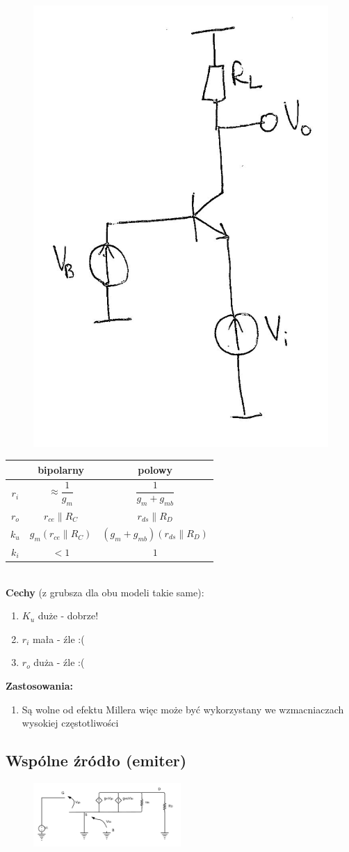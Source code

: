 \documentclass[10pt,a4paper]{article}
\begin{document}
\begin{figure}[H]
\centering
\includegraphics[height=0.5\textwidth]{WB}
\end{figure}
\begin{tabular}{c|c|c}
& bipolarny & polowy \\
\hline
$r_i$ & $\approx \dfrac{1}{g_m}$ & $ \dfrac{1}{g_m + g_{mb}}$ \\ 

$r_o$ & $r_{ce}\parallel R_C$ & $r_{ds} \parallel R_D $\\ 

$k_u$ & $g_m (r_{ce}\parallel R_C)$ & $(g_m + g_{mb})(r_{ds}\parallel R_D)$  \\ 

$k_i$ & $<1$ & $1$  \\ 

\end{tabular} 
\\
\textbf{Cechy} (z grubsza dla obu modeli takie same):
\begin{enumerate}
	\item \textbf{$K_u$} duże - dobrze!
	\item \textbf{$r_i$} mała - źle :(
	\item \textbf{$r_o$} duża - źle :(
\end{enumerate}
\textbf{Zastosowania:}
\begin{enumerate}
	\item Są wolne od efektu Millera więc może być wykorzystany we wzmacniaczach wysokiej częstotliwości
\end{enumerate}

\subsection{Wspólne źródło (emiter)}


\begin{figure}[H]
\centering
\includegraphics[width=0.5\textwidth]{CS}
\end{figure}
\end{document}
